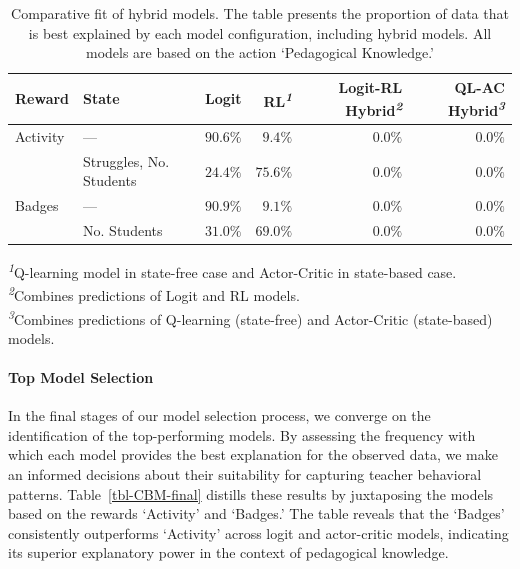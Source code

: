 \documentclass[
  number,
  preprint,
  3p,
  onecolumn]{elsarticle}
\let\oldparagraph\paragraph
\renewcommand{\paragraph}[1]{\oldparagraph{#1}\mbox{}}
\begin{document}
\setlength{\LTpost}{0mm}

\begin{longtable}{l|lrrrr}

\caption{\label{tbl-CBM-second}Comparative fit of hybrid models. The
table presents the proportion of data that is best explained by each
model configuration, including hybrid models. All models are based on
the action `Pedagogical Knowledge.'}

\tabularnewline

\toprule
\multicolumn{1}{l}{Reward} & State & Logit & RL\textsuperscript{\textit{1}} & Logit-RL Hybrid\textsuperscript{\textit{2}} & QL-AC Hybrid\textsuperscript{\textit{3}} \\ 
\midrule\addlinespace[2.5pt]
Activity & — & $90.6\%$ & $9.4\%$ & $0.0\%$ & $0.0\%$ \\ 
 & Struggles, No. Students & $24.4\%$ & $75.6\%$ & $0.0\%$ & $0.0\%$ \\ 
\midrule\addlinespace[2.5pt]
Badges & — & $90.9\%$ & $9.1\%$ & $0.0\%$ & $0.0\%$ \\ 
 & No. Students & $31.0\%$ & $69.0\%$ & $0.0\%$ & $0.0\%$ \\ 
\bottomrule

\end{longtable}

\begin{minipage}{\linewidth}
\textsuperscript{\textit{1}}Q-learning model in state-free case and Actor-Critic in state-based case.\\
\textsuperscript{\textit{2}}Combines predictions of Logit and RL models.\\
\textsuperscript{\textit{3}}Combines predictions of Q-learning (state-free) and Actor-Critic (state-based) models.\\
\end{minipage}

\paragraph{Top Model Selection}\label{top-model-selection-1}

In the final stages of our model selection process, we converge on the
identification of the top-performing models. By assessing the frequency
with which each model provides the best explanation for the observed
data, we make an informed decisions about their suitability for
capturing teacher behavioral patterns. Table~\ref{tbl-CBM-final}
distills these results by juxtaposing the models based on the rewards
`Activity' and `Badges.' The table reveals that the `Badges'
consistently outperforms `Activity' across logit and actor-critic
models, indicating its superior explanatory power in the context of
pedagogical knowledge.
\end{document}
